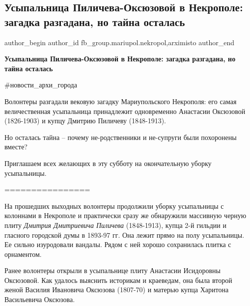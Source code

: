  
 
 
 
 

\subsection{Усыпальница Пиличева-Оксюзовой в Некрополе: загадка разгадана, но тайна осталась}
\label{sec:08_10_2021.fb.fb_group.mariupol.nekropol.1.usypalnica_pilicheva_oksjuzovoj_v_nekropole_zagadka_tajna}
 
\ifcmt
 author_begin
   author_id fb_group.mariupol.nekropol,arximisto
 author_end
\fi

\vspace{0.5cm}
\textbf{Усыпальница Пиличева-Оксюзовой в Некрополе: загадка разгадана, но тайна
осталась}

\#новости\_архи\_города

Волонтеры разгадали вековую загадку Мариупольского Некрополя: его самая
величественная усыпальница принадлежит одновременно Анастасии Оксюзовой
(1826-1903) и купцу Дмитрию Пиличеву (1848-1913).

Но осталась тайна – почему не-родственники и не-супруги были похоронены вместе?

Приглашаем всех желающих в эту субботу на окончательную уборку усыпальницы.

================

На прошедших выходных волонтеры продолжили уборку усыпальницы с колоннами в
Некрополе и практически сразу же обнаружили массивную черную плиту \emph{Дмитрия
Дмитриевича Пиличева} (1848-1913), купца 2-й гильдии и гласного городской думы в
1893-97 гг. Она лежит прямо на полу усыпальницы. Ее сильно изуродовали вандалы.
Рядом с ней хорошо сохранилась плитка с орнаментом.

Ранее волонтеры открыли в усыпальнице плиту Анастасии Исидоровны Оксюзовой. Как
удалось выяснить историкам и краеведам, она была второй женой Василия Ивановича
Оксюзова (1807-70) и матерью купца Харитона Васильевича Оксюзова.

